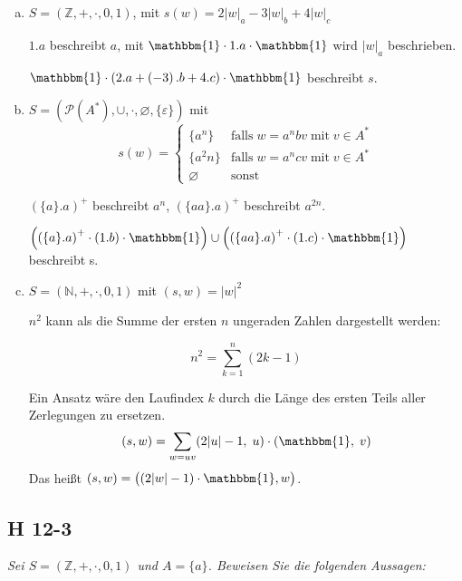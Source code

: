\documentclass{scrartcl}
\begin{document}
\begin{enumerate}[(a)]
    \item $S = (\mathbb{Z}, +, \cdot, 0, 1)$, mit $s(w) = 2|w|_a -3|w|_b + 4|w|_c$

      $1.a$ beschreibt $a$, mit $\mathbbm{1} \cdot 1.a \cdot \mathbbm{1}$ wird $|w|_a$ beschrieben.

      $\mathbbm{1} \cdot \left(2.a + \left(-3\right).b + 4.c\right) \cdot \mathbbm{1}$ beschreibt $s$.

    \item $S = (\mathcal{P}(A^*), \cup, \cdot, \varnothing, \{\varepsilon\})$ mit
      \begin{equation*}
        s(w) = \begin{cases}
          \{a^n\}     &\text{falls}\;w = a^nbv\;\text{mit}\;v \in A^*\\
          \{a^2n\}    &\text{falls}\;w=a^ncv\;\text{mit}\;v \in A^*\\
          \varnothing &\text{sonst}
        \end{cases}
      \end{equation*}

      $(\{a\}.a)^+$ beschreibt $a^n$, $(\{aa\}.a)^+$ beschreibt $a^{2n}$.

      $\left(\left(\{a\}.a\right)^+ \cdot \left(1.b\right) \cdot \mathbbm{1}\right) \cup \left(\left(\{aa\}.a\right)^+ \cdot \left(1.c\right) \cdot \mathbbm{1}\right)$ beschreibt s.

    \item $S = (\mathbb{N}, +, \cdot, 0, 1)$ mit $(s, w) = |w|^2$

      $n^2$ kann als die Summe der ersten $n$ ungeraden Zahlen dargestellt werden:

      $$n^2 = \sum^n_{k=1} (2k-1)$$

      Ein Ansatz wäre den Laufindex $k$ durch die Länge des ersten Teils aller Zerlegungen zu ersetzen.
      \begin{align*}
        (s, w) &= \sum_{w=uv} (2|u|-1,\;u)\cdot(\mathbbm{1},\;v)\\
      \end{align*}
    Das heißt $(s, w) = \big((2|w|-1) \cdot \mathbbm{1}, w\big)$.
\end{enumerate}

\subsection{H 12-3}

\textsl{Sei $S = (\mathbb{Z}, +, \cdot, 0, 1)$ und $A = \{a\}$. Beweisen Sie die folgenden Aussagen:}
\end{document}
